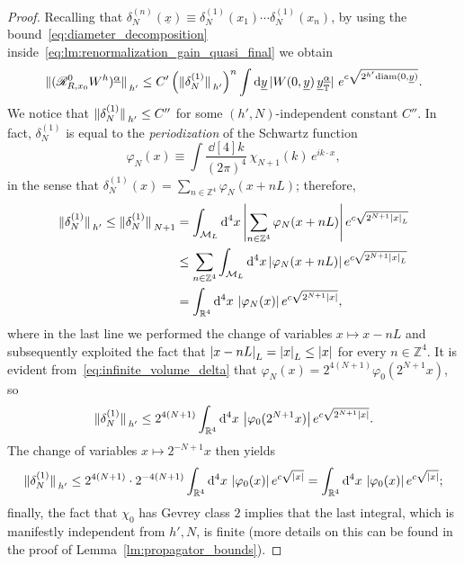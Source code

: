 \documentclass[a4paper, 11pt]{article}
\newcommand{\Z}{\mathbb{Z}}									%
\newcommand{\R}{\mathbb{R}}
\newcommand{\sing}[2]{{#1}^{#2}}							%
\renewcommand{\phi}{\varphi}								%
\newcommand{\kren}{\mathscr{R}}								%
\newcommand{\torus}{{\scriptstyle{\mathbb{T}}}}				%
\theoremstyle{thm}
\begin{document}
\begin{proof}
Recalling that $\delta^{(n)}_N(\underline{x}) \equiv \delta^{(1)}_N(x_1) \cdots \delta^{(1)}_N(x_n)$, by using the bound~\eqref{eq:diameter_decomposition} inside~\eqref{eq:lm:renormalization_gain_quasi_final} we obtain
\begin{equation}
\label{eq:lm:renormalization_gain_penultimate}
\norm*{(\kren_{R, x_0}^0 \sing{W}{h})^{\underline{\alpha}}}_{h'} \le C' \left(\norm*{\delta^{(1)}_N}_{h'}\right)^n \int \dd{\underline{y}} \abs*{W(0, \underline{y}) \, \underline{y}^{\underline{\alpha}}_\torus} \, e^{c \sqrt{2^{h'}\mathrm{diam}(0, \underline{y})}}.
\end{equation}
We notice that $\norm*{\delta^{(1)}_N}_{h'} \le C''$ for some $(h', N)$-independent constant $C''$. In fact, $\delta^{(1)}_N$ is equal to the \emph{periodization} of the Schwartz function
\begin{equation}
\label{eq:infinite_volume_delta}
\phi_N(x) \equiv \int \frac{\dd[4]{k}}{(2\pi)^4} \, \chi_{N+1}(k) \, e^{i k \cdot x},
\end{equation}
in the sense that $\delta^{(1)}_N(x) = \sum_{n \in \Z^4} \phi_N(x + nL)$; therefore,
\begin{equation}
\label{eq:delta_estimate}
\begin{split}
\norm*{\delta^{(1)}_N}_{h'} \le \norm*{\delta^{(1)}_N}_{N+1} 
& = \int_{\mathcal{M}_L} \dd[4]{x} \abs{\sum_{n \in \Z^4} \phi_N(x + nL)} \, e^{c\sqrt{2^{N+1} \abs{x}_L}} \\
& \le \sum_{n \in \Z^4} \int_{\mathcal{M}_L} \dd[4]{x} \abs{\phi_N(x + nL)} \, e^{c\sqrt{2^{N+1} \abs{x}_L}} \\
& = \int_{\R^4} \dd[4]{x} \, \abs{\phi_N(x)} \, e^{c\sqrt{2^{N+1} \abs{x}}},
\end{split}
\end{equation}
where in the last line we performed the change of variables $x \mapsto x - nL$ and subsequently exploited the fact that $\abs{x-nL}_L = \abs{x}_L \le \abs{x}$ for every $n \in \Z^4$. It is evident from~\eqref{eq:infinite_volume_delta} that $\phi_N(x) = 2^{4(N+1)} \phi_0(2^{N+1} x)$, so
\begin{equation}
\norm*{\delta^{(1)}_N}_{h'} \le 2^{4(N+1)} \int_{\R^4} \dd[4]{x} \, \abs{\phi_0(2^{N+1} x)} \, e^{c\sqrt{2^{N+1} \abs{x}}}.
\end{equation}
The change of variables $x \mapsto 2^{-{N+1}} x$ then yields
\begin{equation}
\norm*{\delta^{(1)}_N}_{h'} \le 2^{4(N+1)} \cdot 2^{-4(N+1)} \int_{\R^4} \dd[4]{x} \, \abs{\phi_0(x)} \, e^{c\sqrt{\abs{x}}} = \int_{\R^4} \dd[4]{x} \, \abs{\phi_0(x)} \, e^{c\sqrt{\abs{x}}};
\end{equation}
finally, the fact that $\chi_0$ has Gevrey class $2$ implies that the last integral, which is manifestly independent from $h', N$, is finite (more details on this can be found in the proof of Lemma~\ref{lm:propagator_bounds}).


\end{proof}
\end{document}
